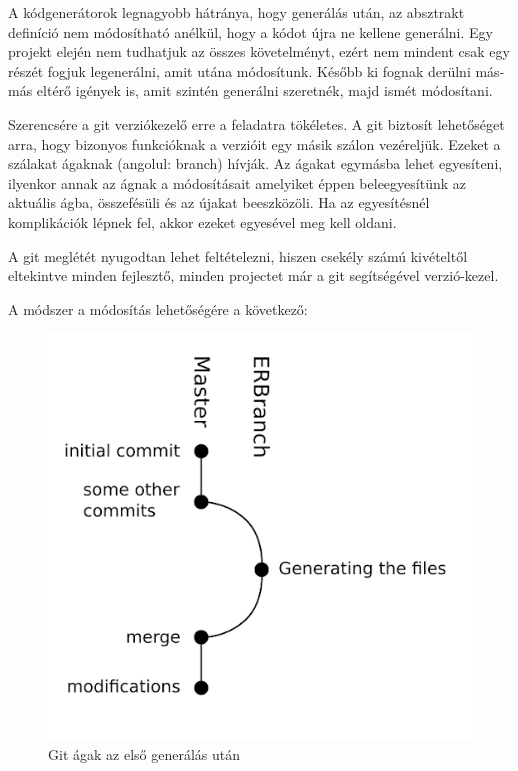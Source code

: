 \documentclass[a4paper,12pt,oneside]{report}
\begin{document}
\begin{justify}


	A kódgenerátorok legnagyobb hátránya, hogy generálás után, az absztrakt definíció nem módosítható anélkül, hogy a kódot újra ne kellene generálni. Egy projekt elején nem tudhatjuk az összes követelményt, ezért nem mindent csak egy részét fogjuk legenerálni, amit utána módosítunk. Később ki fognak derülni más-más eltérő igények is, amit szintén generálni szeretnék, majd ismét módosítani.

	Szerencsére a git verziókezelő erre a feladatra tökéletes. A git biztosít lehetőséget arra, hogy bizonyos funkcióknak a verzióit egy másik szálon vezéreljük. Ezeket a szálakat ágaknak (angolul: branch) hívják. Az ágakat egymásba lehet egyesíteni, ilyenkor annak az ágnak a módosításait amelyiket éppen beleegyesítünk az aktuális ágba, összefésüli és az újakat beeszközöli. Ha az egyesítésnél komplikációk lépnek fel, akkor ezeket egyesével meg kell oldani. 

	A git meglétét nyugodtan lehet feltételezni, hiszen csekély számú kivételtől eltekintve minden fejlesztő, minden projectet már a git segítségével verzió-kezel.

	A módszer a módosítás lehetőségére a következő:


	\begin{figure}[h]
		\includegraphics[width=\textwidth]{contents/images/git_first.png}
		\caption{Git ágak az első generálás után}
		\label{fig:git_first}
	\end{figure}


\end{justify}
\end{document}
